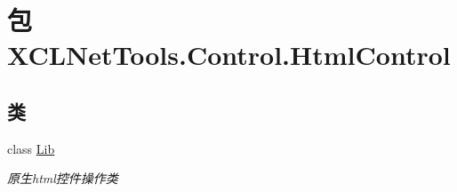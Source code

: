 \hypertarget{namespace_x_c_l_net_tools_1_1_control_1_1_html_control}{\section{包 X\-C\-L\-Net\-Tools.\-Control.\-Html\-Control}
\label{namespace_x_c_l_net_tools_1_1_control_1_1_html_control}
}
\subsection*{类}
\begin{DoxyCompactItemize}
\item 
class \hyperlink{class_x_c_l_net_tools_1_1_control_1_1_html_control_1_1_lib}{Lib}
\begin{DoxyCompactList}\small\item\em 原生html控件操作类 \end{DoxyCompactList}\end{DoxyCompactItemize}
